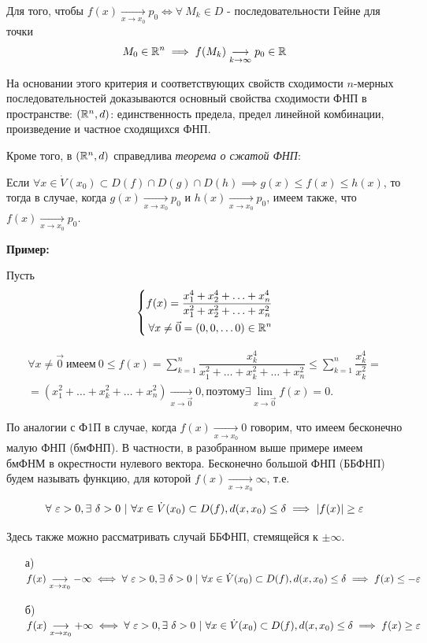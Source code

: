 \documentclass[../../main.tex]{subfiles}
\begin{document}
Для того, чтобы $f(x)\underset{x \to x_0}{\longrightarrow}p_0 \iff \forall\ M_k \in D$ -
последовательности Гейне для точки 
\[M_0 \in \mathbb{R}^n \implies f(M_k)\underset{k \to \infty}{\longrightarrow}p_0 \in \mathbb{R}\]   

На основании этого критерия и соответствующих свойств сходимости $n$-мерных
последовательностей доказываются основный свойства сходимости ФНП
в пространстве: $(\mathbb{R}^n, d)$: единственность предела, предел линейной комбинации,
произведение и частное сходящихся ФНП.

Кроме того, в $(\mathbb{R}^n, d)$ справедлива \emph{теорема о сжатой ФНП}:

Если $\forall x \in \dot{V}(x_0) \subset D(f) \cap D(g) \cap D(h) \implies
g(x) \leq f(x) \leq h(x)$, то тогда в случае, когда
$g(x)\underset{x \to x_0}{\longrightarrow}p_0
$ и $h(x)\underset{x \to x_0}{\longrightarrow}p_0$,
имеем также, что $f(x)\underset{x \to x_0}{\longrightarrow}p_0$.

\textbf{Пример:}

Пусть \[ \left\{\begin{aligned}
	f(x) = \dfrac{x_1^4 + x_2^4 + \ldots + x_n^4}{x_1^2 + x_2^2 + \ldots + x_n^2} \\
	\forall x \ne \vec{0} = (0, 0, \ldots 0) \in \mathbb{R}^n
\end{aligned}\right. \]

\begin{gather*}
	\forall x \ne \vec{0}\ \text{имеем}\ 0 \leq f(x) =
	\displaystyle\sum_{k=1}^{n}{\dfrac{x_k^4}{x_1^2 + \dots + x_k^2 + \ldots + x_n^2}} \le
	\displaystyle\sum_{k=1}^{n}{\dfrac{x_k^4}{x_k^2}} = \\ =
	(x_1^2 + \ldots + x_k^2 + \ldots + x_n^2)
	\underset{x \to \vec{0}}{\longrightarrow}0, \text{поэтому}
	\exists\displaystyle\lim_{x \to \vec{0}}f(x) = 0.
\end{gather*}

По аналогии с Ф1П в случае, когда $f(x)\underset{x \to x_0}{\longrightarrow}0$
говорим, что имеем бесконечно малую ФНП (бмФНП). В частности, в разобранном выше примере
имеем бмФНМ в окрестности нулевого вектора. Бесконечно большой ФНП (ББФНП) будем
называть функцию, для которой $f(x)\underset{x \to x_0}{\longrightarrow}\infty$, т.е.

\[\forall\ \varepsilon > 0, \exists\ \delta > 0\ |\
\forall x \in \dot{V}(x_0) \subset D(f), d(x, x_0) \leq \delta
\implies |f(x)| \geq \varepsilon\]

Здесь также можно рассматривать случай ББФНП, стемящейся к $\pm \infty$.
\begin{itemize}
	\item[а)] $f(x)\underset{x \to x_0}{\longrightarrow} -\infty \iff
	\forall\ \varepsilon > 0, \exists\ \delta > 0\ |\
	\forall x \in \dot{V}(x_0) \subset D(f), d(x, x_0) \leq \delta
	\implies f(x) \leq -\varepsilon$
	\item[б)] $f(x)\underset{x \to x_0}{\longrightarrow} +\infty \iff
	\forall\ \varepsilon > 0, \exists\ \delta > 0\ |\
	\forall x \in \dot{V}(x_0) \subset D(f), d(x, x_0) \leq \delta
	\implies f(x) \geq \varepsilon$
\end{itemize}
\end{document}
